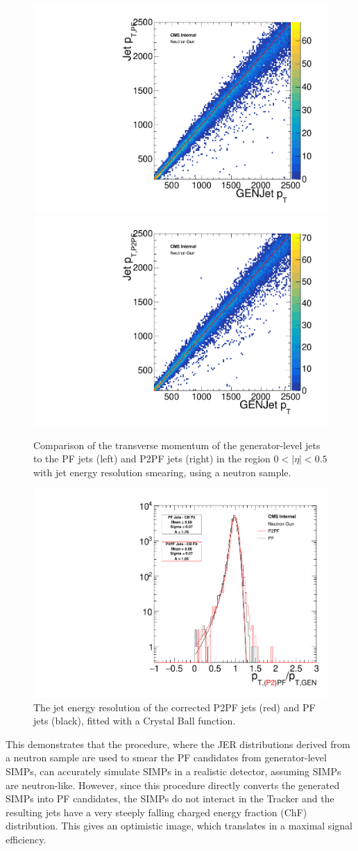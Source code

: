 \begin{figure}[ht]
  \centering
 \includegraphics[width=.48\textwidth]{pt_neutron_gun_th2f_005.pdf} \hfill
\includegraphics[width=.48\textwidth]{pt_neutron_gun_p2pf_th2f_005.pdf}
 \caption{Comparison of the transverse momentum of the generator-level jets to the \ac{PF} jets (left) and P2PF jets (right) in the region $0< |\eta| < 0.5$ with jet energy resolution smearing, using a neutron sample.}
 \label{fig:neutron_corr}
\end{figure}

\begin{figure}[ht]
  \centering
 \includegraphics[width=.75\textwidth]{pt_neutron_gun_res_fit_005.pdf} 
 \caption{The jet energy resolution of the corrected P2PF jets (red) and \ac{PF} jets (black), fitted with a Crystal Ball function.}
 \label{fig:neutron_res_corr}
\end{figure}

This demonstrates that the procedure, where the \ac{JER} distributions derived from a neutron sample are used to smear the \ac{PF} candidates from generator-level \acp{SIMP}, can accurately simulate \acp{SIMP} in a realistic detector, assuming \acp{SIMP} are neutron-like. However, since this procedure directly converts the generated \acp{SIMP} into \ac{PF} candidates, the \acp{SIMP} do not interact in the Tracker and the resulting jets have a very steeply falling charged energy fraction (ChF) distribution. This gives an optimistic image, which translates in a maximal signal efficiency.

